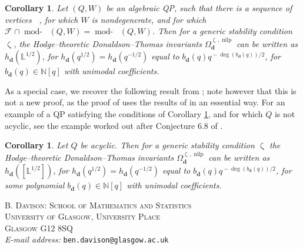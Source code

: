 \documentclass[a4paper,10pt]{amsart}
\newtheorem{corollary}[theorem]{Corollary}
\newcommand{\dd}{\mathbf{d}}
\newcommand{\LL}{\mathbb{L}}
\renewcommand{\zeta}{\upzeta}
\DeclareMathOperator{\nilp}{nilp}
\DeclareMathOperator{\tmod}{mod-}
\newcommand{\rmod}[1]{\tmod\!#1}
\DeclareMathOperator{\HJac}{\widehat{Jac}}
\DeclareMathOperator{\Ss}{\overline{s}}
\begin{document}
\begin{corollary}\label{firstCor}
Let $(Q,W)$ be an algebraic QP, such that there is a sequence of vertices $\Ss$, for which $W$ is nondegenerate, and for which $\mathcal{F}_{\Ss}\cap \rmod{\HJac(Q,W)}=\rmod{\HJac(Q,W)}$.  Then for a generic stability condition $\zeta$, the Hodge--theoretic Donaldson--Thomas invariants $\Omega^{\zeta_{\Ss},\nilp}_{\dd}$ can be written as $h_{\dd}(\LL^{1/2})$, for $h_{\dd}(q^{1/2})=h_{\dd}(q^{-1/2})$ equal to $b_{\dd}(q)q^{{}-\deg(b_{\dd}(q))/2}$, for $b_{\dd}(q)\in\mathbb{N}[q]$ with unimodal coefficients.
\end{corollary}
As a special case, we recover the following result from \cite{MeRe14}; note however that this is not a new proof, as the proof of \cite[Thm.A]{DaMe15b} uses the results of \cite{MeRe14} in an essential way.  For an example of a QP satisfying the conditions of Corollary \ref{firstCor}, and for which $Q$ is not acyclic, see the example worked out after Conjecture 6.8 of \cite{Efi11}.
\begin{corollary}\cite[Cor.1.2]{MeRe14}
Let $Q$ be acyclic.  Then for a generic stability condition $\zeta$ the Hodge--theoretic Donaldson--Thomas invariants $\Omega^{\zeta_{\Ss},\nilp}_{\dd}$ can be written as $h_{\dd}([\LL^{1/2}])$, for $h_{\dd}(q^{1/2})=h_{\dd}(q^{-1/2})$ equal to $b_{\dd}(q)q^{{}-\deg(b_{\dd}(q))/2}$, for some polynomial $b_{\dd}(q)\in\mathbb{N}[q]$ with unimodal coefficients.
\end{corollary}




\vfill

\textsc{\small B. Davison: School of Mathematics and Statistics\\University of Glasgow, University Place\\Glasgow G12 8SQ}\\
\textit{\small E-mail address:} \texttt{\small ben.davison@glasgow.ac.uk}\\
\\
\end{document}
